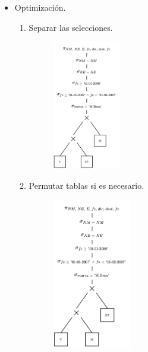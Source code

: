 \documentclass{templateNote}
\begin{document}
\begin{itemize}
    \item Optimizaci\'on.
    \begin{enumerate}
        \item Separar las selecciones.
        \begin{figure}[H]
            \centering
            \includegraphics[width=0.3\textwidth]{img/E6-Paso-1.png}
        \end{figure}

        \newpage
        \item Permutar tablas si es necesario.
        \begin{figure}[H]
            \centering
            \includegraphics[width=0.35\textwidth]{img/E6-Paso-2.png}
        \end{figure}


\end{enumerate}
\end{itemize}
\end{document}

